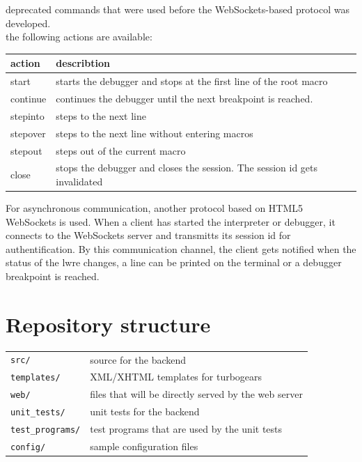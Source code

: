 \text{*} deprecated commands that were used before the WebSockets-based protocol was developed.\\
\text{**} the following actions are available:

\begin{tabular}{l l l}
\hline
action      & describtion \\
\hline
start       & starts the debugger and stops at the first line of the root macro\\
continue    & continues the debugger until the next breakpoint is reached.\\
stepinto    & steps to the next line\\
stepover    & steps to the next line without entering macros\\
stepout     & steps out of the current macro\\
close       & stops the debugger and closes the session. The session id gets invalidated\\
\hline
\end{tabular}

For asynchronous communication, another protocol based on HTML5 WebSockets is used.
When a client has started the interpreter or debugger, it connects to the WebSockets
server and transmitts its session id for authentification. By this communication channel,
the client gets notified when the status of the lwre changes, a line can be printed on the
terminal or a debugger breakpoint is reached.

\section{Repository structure}
\begin{tabular}{l l}
\verb|src/|           & source for the backend\\
\verb|templates/|     & XML/XHTML templates for turbogears\\
\verb|web/|           & files that will be directly served by the web server\\
\verb|unit_tests/|    & unit tests for the backend\\
\verb|test_programs/| & test programs that are used by the unit tests\\
\verb|config/|        & sample configuration files
\end{tabular}
